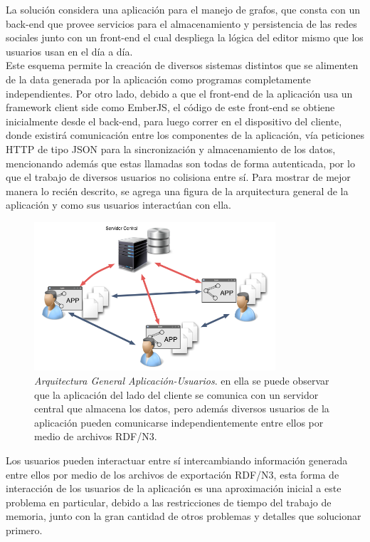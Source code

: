 La solución considera una aplicación para el manejo de grafos, que consta con un back-end que provee servicios para el almacenamiento y persistencia de las redes sociales junto con un front-end el cual despliega la lógica del editor mismo que los usuarios usan en el día a día.\\

Este esquema permite la creación de diversos sistemas distintos que se alimenten de la data generada por la aplicación como programas completamente independientes. Por otro lado, debido a que el front-end de la aplicación usa un framework  client side como EmberJS, el código de este front-end se obtiene inicialmente desde el back-end, para luego correr en el dispositivo del cliente, donde existirá comunicación entre los componentes de la aplicación, vía peticiones HTTP de tipo JSON para la sincronización y almacenamiento de los datos, mencionando además que estas llamadas son todas de forma autenticada, por lo que el trabajo de diversos usuarios no colisiona entre sí. Para mostrar de mejor manera lo recién descrito, se agrega una figura de la arquitectura general de la aplicación y como sus usuarios interactúan con ella.

\begin{figure}[H]
  \centering
  \includegraphics[width=0.8\textwidth]{images/app_distribuida.png}
  \caption[Arquitectura General Aplicación-Usuarios]{\emph{Arquitectura General Aplicación-Usuarios}. en ella se puede observar que la aplicación del lado del cliente se comunica con un servidor central que almacena los datos, pero además diversos usuarios de la aplicación pueden comunicarse independientemente entre ellos por medio de archivos RDF/N3.}
  \label{app_distribuida}
\end{figure}

Los usuarios pueden interactuar entre sí intercambiando información generada entre ellos por medio de los archivos de exportación RDF/N3, esta forma de interacción de los usuarios de la aplicación es una aproximación inicial a este problema en particular, debido a las restricciones de tiempo del trabajo de memoria, junto con la gran cantidad de otros problemas y detalles que solucionar primero.\\


